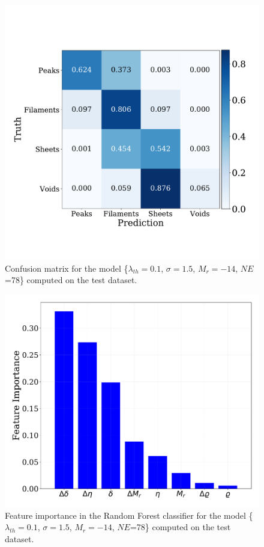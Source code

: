 \documentclass[usenatbib]{mnras}
\begin{document}
\begin{figure}
\centering
    \includegraphics[scale=0.32]{Figs/p_confusion_matrix_valid.pdf}
\caption{Confusion matrix for the model 
      \{$\lambda_{th}=0.1$, $\sigma=1.5$, $M_r=-14$,
      $NE$=78\} computed on the test dataset.}
      \label{fig:confusion_matrix}
\end{figure}

\begin{figure}
    \includegraphics[scale=0.28]{Figs/p_features_importance_valid.pdf}  
    \caption{
      Feature importance in the Random Forest classifier for the model
      \{$\lambda_{th}=0.1$, $\sigma=1.5$, $M_r=-14$,
      $NE$=78\} computed on the test dataset.}
    \label{fig:feature_importance}
\end{figure}
\end{document}
